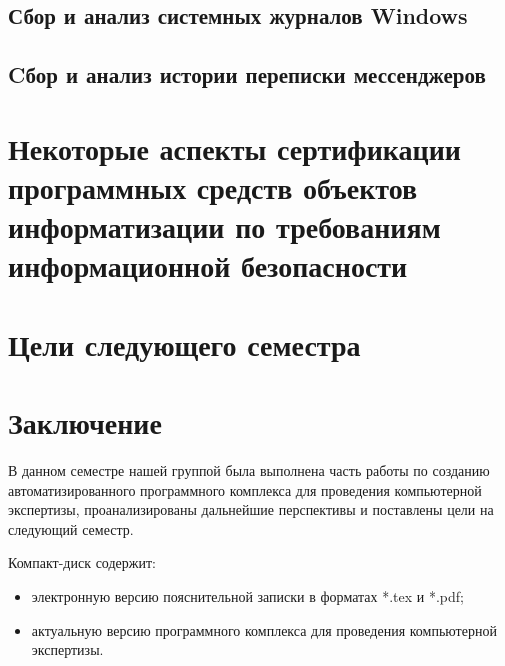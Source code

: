 \documentclass[russian,utf8,14pt,simple]{eskdtext}
\begin{document}
\subsection{Сбор и анализ системных журналов Windows} %

\subsection{Cбор и анализ истории переписки мессенджеров} %


\section{Некоторые аспекты сертификации программных средств объектов\\ информатизации по требованиям информационной безопасности} %
\setcounter{figure}{0}


\newpage
\section{Цели следующего семестра}


\section{Заключение}
В данном семестре нашей группой была выполнена часть работы по созданию автоматизированного программного комплекса для проведения компьютерной экспертизы, проанализированы дальнейшие перспективы и поставлены цели на следующий семестр.

\newpage
\renewcommand{\refname}{Список использованных источников}


Компакт-диск содержит: 
\begin{itemize}
\item электронную версию пояснительной записки в форматах *.tex и *.pdf;
\item актуальную версию программного комплекса для проведения компьютерной экспертизы.
\end{itemize}
\end{document}
